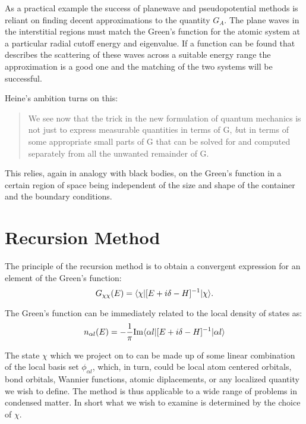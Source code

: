 As a practical example the success of planewave and pseudopotential methods 
is reliant on finding decent approximations to the quantity $G_{A}$. The plane waves
in the interstitial regions must match the Green's function for the atomic system
at a particular radial cutoff energy and eigenvalue. If a function can be found that 
describes the scattering of these waves across a suitable energy range the approximation 
is a good one and the matching of the two systems will be successful.

Heine's ambition turns on this:
%
\begin{quote}
We see now that the trick in the new formulation of quantum 
mechanics is not just to express measurable quantities in terms of 
G, {\emph but in terms of some appropriate small parts of G that can be solved 
for and computed separately from all the unwanted remainder of G.}
\end{quote}
%
This relies, again in analogy with black bodies, on the Green's
function in a certain region of space being independent of the size and shape
of the container and the boundary conditions.

\section{Recursion Method}
  The principle of the recursion method is to obtain a convergent expression 
for an element of the Green's function:
%
\begin{equation}
G_{\chi\chi}(E) = \langle\chi|[E + i\delta -H]^{-1}|\chi\rangle.
\end{equation}
%

The Green's function can be immediately related to the local density of states as:
%
\begin{equation}
n_{\alpha l}(E) = -\frac{1}{\pi} {\rm Im}\langle\alpha l|[E + i\delta -H]^{-1}|\alpha l\rangle
\end{equation}
%

The state $\chi$ which we project on to can be made up of some linear combination 
of the local basis set $\phi_{\alpha l}$, which, in turn, could be local atom centered orbitals, bond orbitals, 
Wannier functions, atomic diplacements, or any localized quantity we wish to define. The method is thus
applicable to a wide range of problems in condensed matter. In short what we wish to examine
is determined by the choice of $\chi$.

